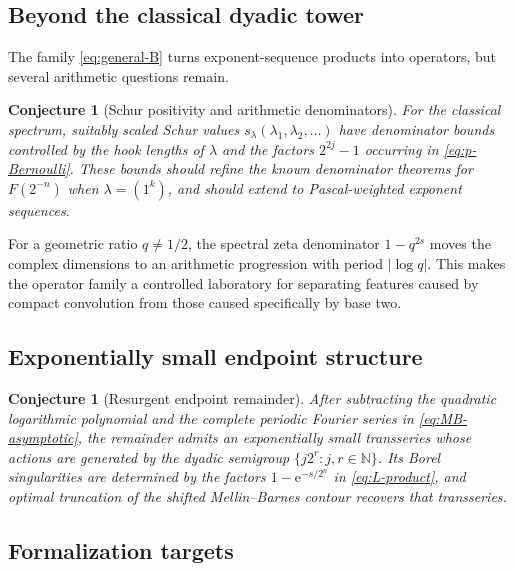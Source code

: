 \documentclass[11pt,oneside]{article}
\newtheorem{conjecture}[theorem]{Conjecture}
\theoremstyle{definition}
\newcommand{\e}{\mathrm e}
\newcommand{\N}{\mathbb N}
\begin{document}
\subsection{Beyond the classical dyadic tower}

The family \eqref{eq:general-B} turns exponent-sequence products into operators, but
several arithmetic questions remain.

\begin{conjecture}[Schur positivity and arithmetic denominators]
\label{conj:Schur-arithmetic}
For the classical spectrum, suitably scaled Schur values
\(s_{\lambda}(\lambda_1,\lambda_2,\ldots)\) have denominator bounds controlled by the
hook lengths of \(\lambda\) and the factors \(2^{2j}-1\) occurring in
\eqref{eq:p-Bernoulli}.  These bounds should refine the known denominator theorems for
\(F(2^{-n})\) when \(\lambda=(1^k)\), and should extend to Pascal-weighted exponent
sequences.
\end{conjecture}

For a geometric ratio \(q\ne1/2\), the spectral zeta denominator
\(1-q^{2s}\) moves the complex dimensions to an arithmetic progression with period
\(|\log q|\).  This makes the operator family a controlled laboratory for separating
features caused by compact convolution from those caused specifically by base two.

\subsection{Exponentially small endpoint structure}

\begin{conjecture}[Resurgent endpoint remainder]
\label{conj:resurgence}
After subtracting the quadratic logarithmic polynomial and the complete periodic
Fourier series in \eqref{eq:MB-asymptotic}, the remainder admits an exponentially
small transseries whose actions are generated by the dyadic semigroup
\(\{j2^r:j,r\in\N\}\).  Its Borel singularities are determined by the factors
\(1-\e^{-s/2^n}\) in \eqref{eq:L-product}, and optimal truncation of the shifted
Mellin--Barnes contour recovers that transseries.
\end{conjecture}

\subsection{Formalization targets}
\end{document}
